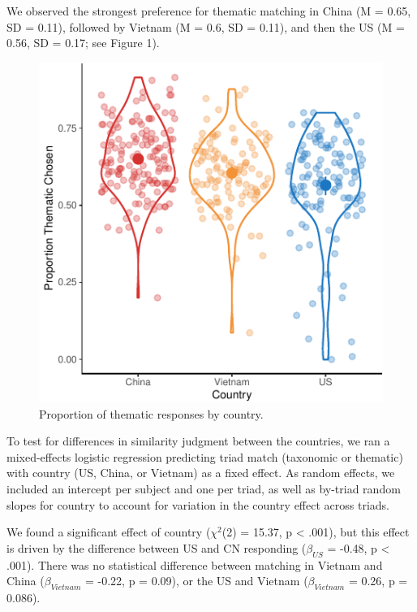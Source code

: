 \documentclass[10pt, letterpaper]{article}
\newenvironment{CodeChunk}{}{}
\begin{document}
We observed the strongest preference for thematic matching in China (M =
0.65, SD = 0.11), followed by Vietnam (M = 0.6, SD = 0.11), and then the
US (M = 0.56, SD = 0.17; see Figure 1).

\begin{CodeChunk}
\begin{figure}[tb]

{\centering \includegraphics{figs/unnamed-chunk-1-1} 

}

\caption[Proportion of thematic responses by country]{Proportion of thematic responses by country.}\label{fig:unnamed-chunk-1}
\end{figure}
\end{CodeChunk}

To test for differences in similarity judgment between the countries, we
ran a mixed-effects logistic regression predicting triad match
(taxonomic or thematic) with country (US, China, or Vietnam) as a fixed
effect. As random effects, we included an intercept per subject and one
per triad, as well as by-triad random slopes for country to account for
variation in the country effect across triads.

We found a significant effect of country (\(\chi^2\)(2) = 15.37, p
\textless{} .001), but this effect is driven by the difference between
US and CN responding (\(\beta_{US}\) = -0.48, p \textless{} .001). There
was no statistical difference between matching in Vietnam and China
(\(\beta_{Vietnam}\) = -0.22, p = 0.09), or the US and Vietnam
(\(\beta_{Vietnam}\) = 0.26, p = 0.086).
\end{document}
